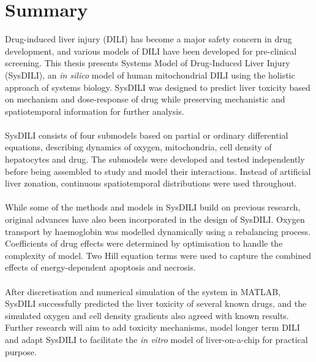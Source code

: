\documentclass[12pt]{article}
\begin{document}
\section*{Summary}
Drug-induced liver injury (DILI) has become a major safety concern in drug development, and various models of DILI have been developed for pre-clinical screening. This thesis presents Systems Model of Drug-Induced Liver Injury (SysDILI), an \textit{in silico} model of human mitochondrial DILI using the holistic approach of systems biology. SysDILI was designed to predict liver toxicity based on mechanism and dose-response of drug while preserving mechanistic and spatiotemporal information for further analysis.\\\\
SysDILI consists of four submodels based on partial or ordinary differential equations, describing dynamics of oxygen, mitochondria, cell density of hepatocytes and drug. The submodels were developed and tested independently before being assembled to study and model their interactions. Instead of artificial liver zonation, continuous spatiotemporal distributions were used throughout.\\\\
While some of the methods and models in SysDILI build on previous research, original advances have also been incorporated in the design of SysDILI. Oxygen transport by haemoglobin was modelled dynamically using a rebalancing process. Coefficients of drug effects were determined by optimisation to handle the complexity of model. Two Hill equation terms were used to capture the combined effects of energy-dependent apoptosis and necrosis.\\\\
After discretisation and numerical simulation of the system in MATLAB, SysDILI successfully predicted the liver toxicity of several known drugs, and the simulated oxygen and cell density gradients also agreed with known results. Further research will aim to add toxicity mechanisms, model longer term DILI and adapt SysDILI to facilitate the \textit{in vitro} model of liver-on-a-chip for practical purpose.


\thispagestyle{empty}
\pagebreak
\thispagestyle{empty}
\tableofcontents
\thispagestyle{empty}
\pagebreak
\end{document}
